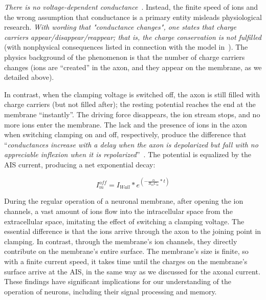\emph{There is no voltage-dependent conductance}~\cite{KochVoltageDependentConductance:1999}.
Instead, the finite speed of ions and the wrong assumption that conductance
is a primary entity misleads physiological research.\emph{ With wording
	that "conductance changes", one states that charge carriers
	appear/disappear/reappear; that is, the charge conservation is not
	fulfilled} (with nonphysical consequences listed in connection with
the model in~\cite{HodgkinHuxley:1952}). The physics background
of the phenomenon is that the number of charge carriers changes (ions
are ``created'' in the axon, and they appear on the membrane, as
we detailed above).

In contrast, when the clamping voltage is switched off, the axon is still
filled with charge carriers (but not filled after); the resting potential reaches the end
at the membrane ``instantly''. The driving force disappears, the
ion stream stops, and no more ions enter the membrane. The lack and
the presence of ions in the axon when switching clamping on and off, respectively, produce the difference that ``\emph{conductances
	increase with a delay when the axon is depolarized but fall with no
	appreciable inflexion when it is repolarized}''~\cite{HodgkinHuxley:1952}.
The potential is equalized by the 
\gls{AIS} current, producing a net
exponential decay:

\begin{equation}
	I_{m}^{off}=I_{Wall}*e^{(-\frac{\alpha}{R_{m}C_{m}}*t)}\label{eq:I_Membrane_Off}
\end{equation}

\noindent 

During the regular operation of a neuronal membrane, after opening
the ion channels, a vast amount of ions flow into the intracellular
space from the extracellular space, imitating the effect of switching
a clamping voltage. The essential difference is that
the ions arrive through the axon to the joining point in clamping.
In contrast, through the membrane's ion channels, they directly contribute on the membrane’s entire surface.
The membrane's size is finite, so with a finite
current speed, it takes time until the charges on the membrane's surface
arrive at the \gls{AIS}, in the same way as we discussed for the
axonal current. These findings have significant implications for our
understanding of the operation of neurons, including their signal processing and memory.

